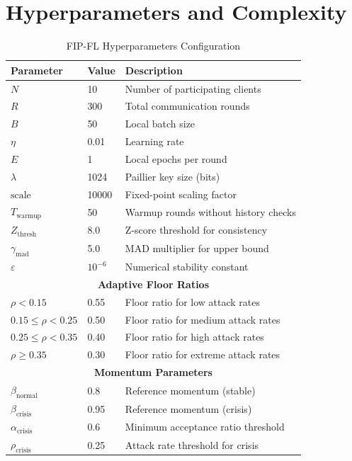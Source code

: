 \documentclass[10pt,journal,compsoc]{IEEEtran}
\begin{document}
\section{Hyperparameters and Complexity}
\label{sec:params}

\begin{table}[H]
\caption{FIP-FL Hyperparameters Configuration}
\label{tab:hyperparams}
\begin{center}
\begin{tabular}{@{}lll@{}}
\toprule
\textbf{Parameter} & \textbf{Value} & \textbf{Description} \\
\midrule
$N$ & 10 & Number of participating clients \\
$R$ & 300 & Total communication rounds \\
$B$ & 50 & Local batch size \\
$\eta$ & 0.01 & Learning rate \\
$E$ & 1 & Local epochs per round \\
$\lambda$ & 1024 & Paillier key size (bits) \\
$\text{scale}$ & 10000 & Fixed-point scaling factor \\
$T_{\text{warmup}}$ & 50 & Warmup rounds without history checks \\
$Z_{\text{thresh}}$ & 8.0 & Z-score threshold for consistency \\
$\gamma_{\text{mad}}$ & 5.0 & MAD multiplier for upper bound \\
$\varepsilon$ & $10^{-6}$ & Numerical stability constant \\
\midrule
\multicolumn{3}{c}{\textbf{Adaptive Floor Ratios}} \\
\midrule
$\rho < 0.15$ & 0.55 & Floor ratio for low attack rates \\
$0.15 \leq \rho < 0.25$ & 0.50 & Floor ratio for medium attack rates \\
$0.25 \leq \rho < 0.35$ & 0.40 & Floor ratio for high attack rates \\
$\rho \geq 0.35$ & 0.30 & Floor ratio for extreme attack rates \\
\midrule
\multicolumn{3}{c}{\textbf{Momentum Parameters}} \\
\midrule
$\beta_{\text{normal}}$ & 0.8 & Reference momentum (stable) \\
$\beta_{\text{crisis}}$ & 0.95 & Reference momentum (crisis) \\
$\alpha_{\text{crisis}}$ & 0.6 & Minimum acceptance ratio threshold \\
$\rho_{\text{crisis}}$ & 0.25 & Attack rate threshold for crisis \\
\bottomrule
\end{tabular}
\end{center}
\end{table}
\end{document}
